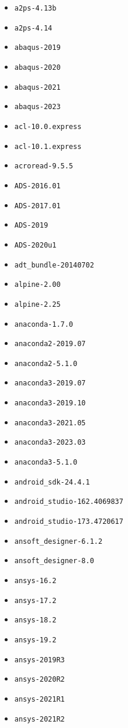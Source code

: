 \scriptsize
\begin{multicols}{3}
\begin{itemize}
\item \verb|a2ps-4.13b|
\item \verb|a2ps-4.14|
\item \verb|abaqus-2019|
\item \verb|abaqus-2020|
\item \verb|abaqus-2021|
\item \verb|abaqus-2023|
\item \verb|acl-10.0.express|
\item \verb|acl-10.1.express|
\item \verb|acroread-9.5.5|
\item \verb|ADS-2016.01|
\item \verb|ADS-2017.01|
\item \verb|ADS-2019|
\item \verb|ADS-2020u1|
\item \verb|adt_bundle-20140702|
\item \verb|alpine-2.00|
\item \verb|alpine-2.25|
\item \verb|anaconda-1.7.0|
\item \verb|anaconda2-2019.07|
\item \verb|anaconda2-5.1.0|
\item \verb|anaconda3-2019.07|
\item \verb|anaconda3-2019.10|
\item \verb|anaconda3-2021.05|
\item \verb|anaconda3-2023.03|
\item \verb|anaconda3-5.1.0|
\item \verb|android_sdk-24.4.1|
\item \verb|android_studio-162.4069837|
\item \verb|android_studio-173.4720617|
\item \verb|ansoft_designer-6.1.2|
\item \verb|ansoft_designer-8.0|
\item \verb|ansys-16.2|
\item \verb|ansys-17.2|
\item \verb|ansys-18.2|
\item \verb|ansys-19.2|
\item \verb|ansys-2019R3|
\item \verb|ansys-2020R2|
\item \verb|ansys-2021R1|
\item \verb|ansys-2021R2|

\end{itemize}
\end{multicols}
